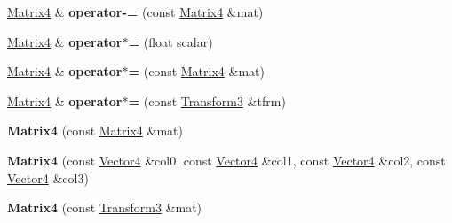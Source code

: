 \begin{DoxyCompactItemize}
\item 
\mbox{\label{classVectormath_1_1Aos_1_1Matrix4_a0d08013f082a61e550297711c572d3b0}} 
\hyperlink{classVectormath_1_1Aos_1_1Matrix4}{Matrix4} \& {\bfseries operator-\/=} (const \hyperlink{classVectormath_1_1Aos_1_1Matrix4}{Matrix4} \&mat)
\item 
\mbox{\label{classVectormath_1_1Aos_1_1Matrix4_ab66ef7a16cea714321e93246291b9c1c}} 
\hyperlink{classVectormath_1_1Aos_1_1Matrix4}{Matrix4} \& {\bfseries operator$\ast$=} (float scalar)
\item 
\mbox{\label{classVectormath_1_1Aos_1_1Matrix4_a442d41f5f6b13d6af851be591fd424b2}} 
\hyperlink{classVectormath_1_1Aos_1_1Matrix4}{Matrix4} \& {\bfseries operator$\ast$=} (const \hyperlink{classVectormath_1_1Aos_1_1Matrix4}{Matrix4} \&mat)
\item 
\mbox{\label{classVectormath_1_1Aos_1_1Matrix4_a70fa2ef1c57440428ffc006b235c4776}} 
\hyperlink{classVectormath_1_1Aos_1_1Matrix4}{Matrix4} \& {\bfseries operator$\ast$=} (const \hyperlink{classVectormath_1_1Aos_1_1Transform3}{Transform3} \&tfrm)
\item 
\mbox{\label{classVectormath_1_1Aos_1_1Matrix4_a025fe2cfa1581016444f2306c1112344}} 
{\bfseries Matrix4} (const \hyperlink{classVectormath_1_1Aos_1_1Matrix4}{Matrix4} \&mat)
\item 
\mbox{\label{classVectormath_1_1Aos_1_1Matrix4_aacf4de7f6db283ad9004ca4328786ce9}} 
{\bfseries Matrix4} (const \hyperlink{classVectormath_1_1Aos_1_1Vector4}{Vector4} \&col0, const \hyperlink{classVectormath_1_1Aos_1_1Vector4}{Vector4} \&col1, const \hyperlink{classVectormath_1_1Aos_1_1Vector4}{Vector4} \&col2, const \hyperlink{classVectormath_1_1Aos_1_1Vector4}{Vector4} \&col3)
\item 
\mbox{\label{classVectormath_1_1Aos_1_1Matrix4_a3fa883e2169015e3de19961e2c1256a1}} 
{\bfseries Matrix4} (const \hyperlink{classVectormath_1_1Aos_1_1Transform3}{Transform3} \&mat)
\item 
\mbox{\label{classVectormath_1_1Aos_1_1Matrix4_ad5545bd33ad2e9d1447c815b3e905bca}} 

\end{DoxyCompactItemize}

